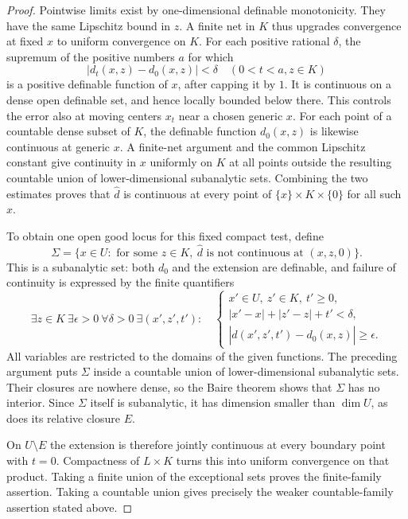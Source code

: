 \begin{proof}
Pointwise limits exist by one-dimensional definable monotonicity. They have the same Lipschitz bound in $z$. A finite net in $K$ thus upgrades convergence at fixed $x$ to uniform convergence on $K$. For each positive rational $\delta$, the supremum of the positive numbers $a$ for which
\[
 |d_t(x,z)-d_0(x,z)|<\delta
       \quad(0<t<a, z\in K)
\]
is a positive definable function of $x$, after capping it by $1$. It is continuous on a dense open definable set, and hence locally bounded below there. This controls the error also at moving centers $x_t$ near a chosen generic $x$. For each point of a countable dense subset of $K$, the definable function $d_0(x,z)$ is likewise continuous at generic $x$. A finite-net argument and the common Lipschitz constant give continuity in $x$ uniformly on $K$ at all points outside the resulting countable union of lower-dimensional subanalytic sets. Combining the two estimates proves that $\widehat d$ is continuous at every point of $\{x\}\times K\times\{0\}$ for all such $x$.

To obtain one open good locus for this fixed compact test, define
\[
 \Sigma=\{x\in U:\text{ for some }z\in K,\
        \widehat d\text{ is not continuous at }(x,z,0)\}.
\]
This is a subanalytic set: both $d_0$ and the extension are definable, and failure of continuity is expressed by the finite quantifiers
\[
 \exists z\in K\ \exists\epsilon>0\ \forall\delta>0\
 \exists(x',z',t'):\quad
 \begin{cases}
 x'\in U,\ z'\in K,\ t'\geq0,\\
 |x'-x|+|z'-z|+t'<\delta,\\
 |\widehat d(x',z',t')-d_0(x,z)|\geq\epsilon.
 \end{cases}
\]
All variables are restricted to the domains of the given functions. The preceding argument puts $\Sigma$ inside a countable union of lower-dimensional subanalytic sets. Their closures are nowhere dense, so the Baire theorem shows that $\Sigma$ has no interior. Since $\Sigma$ itself is subanalytic, it has dimension smaller than $\dim U$, as does its relative closure $E$.

On $U\setminus E$ the extension is therefore jointly continuous at every boundary point with $t=0$. Compactness of $L\times K$ turns this into uniform convergence on that product. Taking a finite union of the exceptional sets proves the finite-family assertion. Taking a countable union gives precisely the weaker countable-family assertion stated above.
\end{proof}


